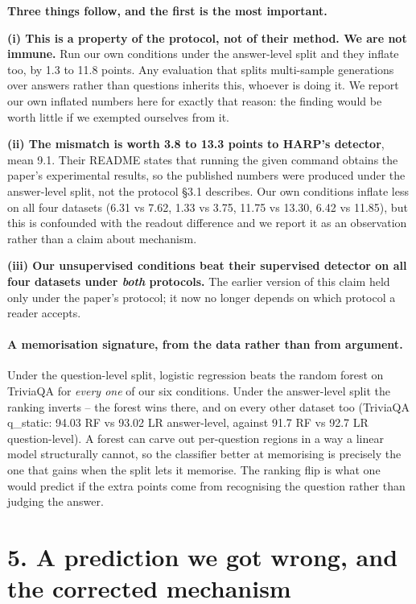 \documentclass[11pt,a4paper]{article}
\begin{document}
\noindent\textbf{Three things follow, and the first is the most important.}

\medskip
\noindent\textbf{(i) This is a property of the protocol, not of their method. We are not immune.}
Run our own conditions under the answer-level split and they inflate too, by 1.3 to 11.8 points.
Any evaluation that splits multi-sample generations over answers rather than questions inherits
this, whoever is doing it. We report our own inflated numbers here for exactly that reason: the
finding would be worth little if we exempted ourselves from it.

\medskip
\noindent\textbf{(ii) The mismatch is worth 3.8 to 13.3 points to HARP's detector}, mean 9.1.
Their README states that running the given command obtains the paper's experimental results, so
the published numbers were produced under the answer-level split, not the protocol \S3.1 describes.
Our own conditions inflate less on all four datasets (6.31 vs 7.62, 1.33 vs 3.75, 11.75 vs 13.30,
6.42 vs 11.85), but this is confounded with the readout difference and we report it as an
observation rather than a claim about mechanism.

\medskip
\noindent\textbf{(iii) Our unsupervised conditions beat their supervised detector on all four
datasets under \emph{both} protocols.} The earlier version of this claim held only under the
paper's protocol; it now no longer depends on which protocol a reader accepts.

\paragraph{A memorisation signature, from the data rather than from argument.} Under the
question-level split, logistic regression beats the random forest on TriviaQA for
\emph{every one} of our six conditions. Under the answer-level split the ranking inverts -- the
forest wins there, and on every other dataset too (TriviaQA q\_static: 94.03 RF vs 93.02 LR
answer-level, against 91.7 RF vs 92.7 LR question-level). A forest can carve out per-question
regions in a way a linear model structurally cannot, so the classifier better at memorising is
precisely the one that gains when the split lets it memorise. The ranking flip is what one would
predict if the extra points come from recognising the question rather than judging the answer.

\section*{5. A prediction we got wrong, and the corrected mechanism}
\end{document}
